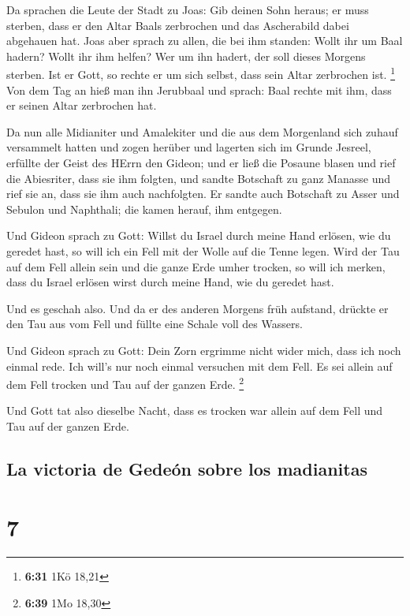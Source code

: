  Da sprachen die Leute der Stadt zu Joas: Gib deinen Sohn
heraus; er muss sterben, dass er den Altar Baals zerbrochen und das
Ascherabild dabei abgehauen hat.  Joas aber sprach zu
allen, die bei ihm standen: Wollt ihr um Baal hadern? Wollt ihr ihm
helfen? Wer um ihn hadert, der soll dieses Morgens sterben. Ist er Gott,
so rechte er um sich selbst, dass sein Altar zerbrochen ist. \footnote{\textbf{6:31}
  1Kö 18,21}  Von dem Tag an hieß man ihn Jerubbaal und
sprach: Baal rechte mit ihm, dass er seinen Altar zerbrochen hat.

 Da nun alle Midianiter und Amalekiter und die aus dem
Morgenland sich zuhauf versammelt hatten und zogen herüber und lagerten
sich im Grunde Jesreel,  erfüllte der Geist des HErrn den
Gideon; und er ließ die Posaune blasen und rief die Abiesriter, dass sie
ihm folgten,  und sandte Botschaft zu ganz Manasse und
rief sie an, dass sie ihm auch nachfolgten. Er sandte auch Botschaft zu
Asser und Sebulon und Naphthali; die kamen herauf, ihm entgegen.

 Und Gideon sprach zu Gott: Willst du Israel durch meine
Hand erlösen, wie du geredet hast,  so will ich ein Fell
mit der Wolle auf die Tenne legen. Wird der Tau auf dem Fell allein sein
und die ganze Erde umher trocken, so will ich merken, dass du Israel
erlösen wirst durch meine Hand, wie du geredet hast.

 Und es geschah also. Und da er des anderen Morgens früh
aufstand, drückte er den Tau aus vom Fell und füllte eine Schale voll
des Wassers.

 Und Gideon sprach zu Gott: Dein Zorn ergrimme nicht
wider mich, dass ich noch einmal rede. Ich will's nur noch einmal
versuchen mit dem Fell. Es sei allein auf dem Fell trocken und Tau auf
der ganzen Erde. \footnote{\textbf{6:39} 1Mo 18,30}

 Und Gott tat also dieselbe Nacht, dass es trocken war
allein auf dem Fell und Tau auf der ganzen Erde.

\hypertarget{la-victoria-de-gedeuxf3n-sobre-los-madianitas}{%
\subsection{La victoria de Gedeón sobre los
madianitas}\label{la-victoria-de-gedeuxf3n-sobre-los-madianitas}}

\hypertarget{section-6}{%
\section{7}\label{section-6}}

